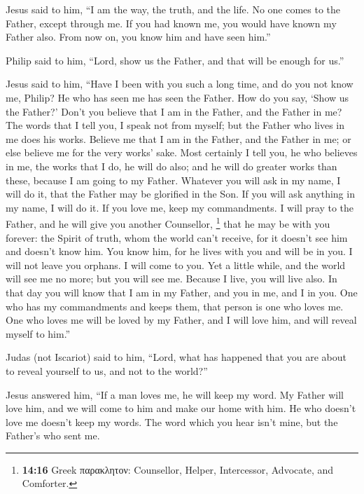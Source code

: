  Jesus said to him, ``I am the way, the truth, and the
life. No one comes to the Father, except through me.  If
you had known me, you would have known my Father also. From now on, you
know him and have seen him.''

 Philip said to him, ``Lord, show us the Father, and that
will be enough for us.''

 Jesus said to him, ``Have I been with you such a long
time, and do you not know me, Philip? He who has seen me has seen the
Father. How do you say, `Show us the Father?'  Don't you
believe that I am in the Father, and the Father in me? The words that I
tell you, I speak not from myself; but the Father who lives in me does
his works.  Believe me that I am in the Father, and the
Father in me; or else believe me for the very works' sake.
 Most certainly I tell you, he who believes in me, the
works that I do, he will do also; and he will do greater works than
these, because I am going to my Father.  Whatever you
will ask in my name, I will do it, that the Father may be glorified in
the Son.  If you will ask anything in my name, I will do
it.  If you love me, keep my commandments.
 I will pray to the Father, and he will give you another
Counsellor, \footnote{\textbf{14:16} Greek παρακλητον: Counsellor,
  Helper, Intercessor, Advocate, and Comforter.} that he may be with you
forever:  the Spirit of truth, whom the world can't
receive, for it doesn't see him and doesn't know him. You know him, for
he lives with you and will be in you.  I will not leave
you orphans. I will come to you.  Yet a little while, and
the world will see me no more; but you will see me. Because I live, you
will live also.  In that day you will know that I am in
my Father, and you in me, and I in you.  One who has my
commandments and keeps them, that person is one who loves me. One who
loves me will be loved by my Father, and I will love him, and will
reveal myself to him.''

 Judas (not Iscariot) said to him, ``Lord, what has
happened that you are about to reveal yourself to us, and not to the
world?''

 Jesus answered him, ``If a man loves me, he will keep my
word. My Father will love him, and we will come to him and make our home
with him.  He who doesn't love me doesn't keep my words.
The word which you hear isn't mine, but the Father's who sent me.

